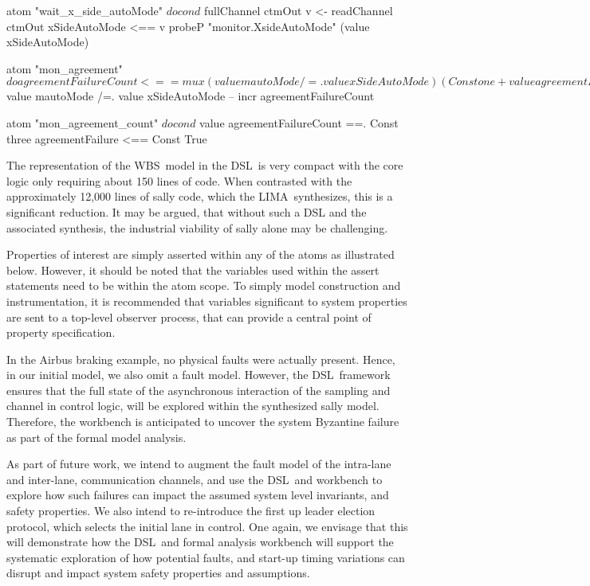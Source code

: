 \begin{lima}
atom "wait_x_side_autoMode" $ do
      cond $ fullChannel ctmOut
      v <- readChannel ctmOut
      xSideAutoMode <== v
      probeP "monitor.XsideAutoMode" (value xSideAutoMode)

 atom "mon_agreement" $ do
      agreementFailureCount <==
        mux (value mautoMode /=. value xSideAutoMode)
            (Const one + value agreementFailureCount)
            (Const zero)
      -- cond $ value mautoMode /=. value xSideAutoMode
      -- incr agreementFailureCount

    atom "mon_agreement_count" $ do
      cond $ value agreementFailureCount ==. Const three
      agreementFailure <== Const True

\end{lima}

The representation of the WBS\ model in the DSL\ is very compact with the core logic only requiring about 150 lines of code.
 When contrasted with the approximately 12,000
lines of sally code, which the LIMA\ synthesizes,  this is a significant reduction. It may be argued, that without such a DSL and the associated synthesis, the industrial viability of sally alone may be challenging.

  
 Properties of interest  are simply asserted within any of the atoms as illustrated below. However, it should be noted that the variables used within the assert statements need to be within the atom scope.
 To simply model construction and instrumentation, it is recommended that variables significant to system properties are sent to a top-level observer process, that can provide a central point of property specification.  



In the Airbus braking example, no physical faults were actually present. Hence, in our initial model, we also omit a  fault model. However, the DSL\ framework ensures that the full state of the asynchronous interaction of the sampling and channel in control logic, will be explored within the synthesized  sally model. Therefore, the workbench is anticipated to uncover the system Byzantine failure as part of the formal model analysis.

As part of future work, we intend to augment the fault model
of the intra-lane and inter-lane, communication channels, and use the DSL\
and workbench to explore how such failures can impact the assumed system
level invariants,
and safety properties. We also intend to re-introduce the first up   leader
election protocol, which selects the initial lane in control. One again,
we envisage that this will demonstrate how the DSL\ and formal analysis workbench will support the systematic exploration of how
potential faults, and start-up timing variations can disrupt and impact
system safety properties and assumptions.  \   

